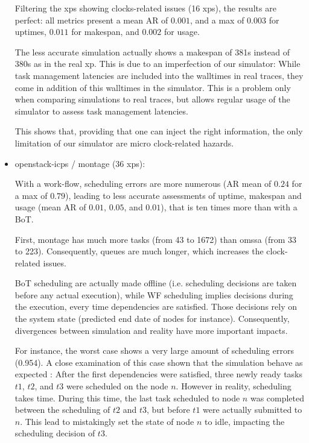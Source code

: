 \documentclass[a4paper,10pt]{article}
\newcommand\vrpath{../../lab/setup/simschlouder/validation-results/}
\begin{document}
\begin{itemize}
      Filtering the xps showing clocks-related issues (16 xps), the results are perfect:
      all metrics present a mean AR of $0.001$, and a max of $0.003$ for uptimes, 
      $0.011$ for makespan, and $0.002$ for usage.
      
      The less accurate simulation actually shows a makespan of 381s instead of 380s
      as in the real xp. This is due to an imperfection of our simulator:
      While task management latencies are included into the walltimes in real traces,
      they come in addition of this walltimes in the simulator.
      This is a problem only when comparing simulations to real traces, but allows
      regular usage of the simulator to assess task management latencies.

      This shows that, providing that one can inject the right information, 
      the only limitation of our simulator are micro clock-related hazards.
      
      
 \item openstack-icps / montage (36 xps): 
 
      

      

      With a work-flow, scheduling errors are more numerous 
      (AR mean of $0.24$ for a max of $0.79$), leading to less accurate assessments
      of uptime, makespan and usage (mean AR of $0.01$, $0.05$, and $0.01$), that
      is ten times more than with a BoT.
      
      First, montage has much more tasks (from 43 to 1672) than omssa (from 33 to 223).
      Consequently, queues are much longer, which increases the clock-related issues.
      
      BoT scheduling are actually made offline (i.e. scheduling decisions are taken
      before any actual execution), while WF scheduling implies decisions during 
      the execution, every time dependencies are satisfied. 
      Those decisions rely on the system state (predicted end date of nodes for 
      instance). Consequently, divergences between simulation and reality have
      more important impacts.
      
      For instance, the worst case shows a very large amount of scheduling errors 
      (0.954). A close examination of this case shown that the simulation behave
      as expected : After the first dependencies were satisfied,
      three newly ready tasks $t1$, $t2$, and $t3$ were scheduled on the node $n$.
      However in reality, scheduling takes time. During this time, the last task
      scheduled to node $n$ was completed between the scheduling of $t2$ and $t3$, 
      but before $t1$ were actually submitted to $n$. This lead to mistakingly 
      set the state of node $n$ to idle, impacting the scheduling decision of $t3$.
      

\end{itemize}
\end{document}
